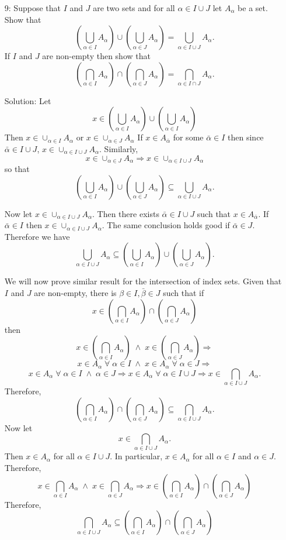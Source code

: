 \begin{enumerate}
\item[9:] Suppose that $I$ and $J$ are two sets and for all $\alpha \in 
I \cup J$ let $A_\alpha$ be a set. Show that
\[
\left(\bigcup_{\alpha \in I} A_\alpha\right) \cup
\left(\bigcup_{\alpha \in J} A_\alpha\right) = 
\bigcup_{\alpha \in I \cup J} A_\alpha.
\]
If $I$ and $J$ are non-empty then show that
\[
\left(\bigcap_{\alpha \in I} A_\alpha\right) \cap
\left(\bigcap_{\alpha \in J} A_\alpha\right) = 
\bigcap_{\alpha \in I \cap J} A_\alpha.
\]
\item[Solution:] Let 
\[
x \in \left(\bigcup_{\alpha \in I} A_\alpha\right) \cup
\left(\bigcup_{\alpha \in I} A_\alpha\right)
\]
Then $x \in \cup_{\alpha \in I} A_\alpha$ or $x \in \cup_{\alpha \in J}
A_\alpha$ If $x \in A_{\bar{\alpha}}$ for some $\bar{\alpha} \in I$ then 
since $\bar{\alpha} \in I \cup J$, $x \in \cup_{\alpha \in I \cup J} 
A_\alpha$. Similarly,
\[
x \in \cup_{\alpha \in J}A_\alpha \Rightarrow x \in \cup_{\alpha \in I 
\cup J} A_\alpha
\]
so that
\[
\left(\bigcup_{\alpha \in I} A_\alpha\right) \cup
\left(\bigcup_{\alpha \in J} A_\alpha\right) \subseteq
\bigcup_{\alpha \in I \cup J} A_\alpha.
\]

Now let $x \in \cup_{\alpha \in I \cup J} A_\alpha$. Then there exists
$\bar{\alpha} \in I \cup J$ such that $x \in A_{\bar{\alpha}}$. If 
$\bar{\alpha} \in I$ then $x \in \cup_{\alpha \in I \cup J}A_\alpha$. The
same conclusion holds good if $\bar{\alpha} \in J$. Therefore we have
\[
\bigcup_{\alpha \in I \cup J} A_\alpha \subseteq
\left(\bigcup_{\alpha \in I} A_\alpha\right) \cup
\left(\bigcup_{\alpha \in J} A_\alpha\right).
\]

We will now prove similar result for the intersection of index sets. Given
that $I$ and $J$ are non-empty, there is $\beta \in I, \bar{\beta} \in J$
such that if
\[
x \in 
\left(\bigcap_{\alpha \in I} A_\alpha\right) \cap
\left(\bigcap_{\alpha \in J} A_\alpha\right) 
\]
then 
\[
x \in \left(\bigcap_{\alpha \in I} A_\alpha\right) \;\land\;
x \in \left(\bigcap_{\alpha \in J} A_\alpha\right) \Rightarrow 
\]
\[
x \in A_\alpha \;\forall\; \alpha \in I \;\land\; x \in A_\alpha
\;\forall\; \alpha \in J \Rightarrow
\]
\[
x \in A_\alpha \;\forall\; \alpha \in I \;\land\; \alpha \in J 
\Rightarrow x \in A_\alpha \;\forall\; \alpha \in I \cup J \Rightarrow
x \in \bigcap_{\alpha \in I \cup J} A_\alpha.
\]
Therefore,
\[
\left(\bigcap_{\alpha \in I} A_\alpha\right) \cap
\left(\bigcap_{\alpha \in J} A_\alpha\right) \subseteq
\bigcap_{\alpha \in I \cup J} A_\alpha.
\]
Now let
\[
x \in \bigcap_{\alpha \in I \cup J} A_\alpha.
\]
Then $x \in A_\alpha$ for all $\alpha \in I \cup J$. In particular, $x
\in A_\alpha$ for all $\alpha \in I$ and $\alpha \in J$. Therefore,
\[
x \in \bigcap_{\alpha \in I}A_\alpha \;\land\;
x \in \bigcap_{\alpha \in J}A_\alpha \Rightarrow 
x \in \left(\bigcap_{\alpha \in I}A_\alpha\right) \cap
\left(\bigcap_{\alpha \in J}A_\alpha\right)
\]
Therefore,
\[
\bigcap_{\alpha \in I \cup J} A_\alpha \subseteq
\left(\bigcap_{\alpha \in I}A_\alpha\right) \cap
\left(\bigcap_{\alpha \in J}A_\alpha\right)
\]


\end{enumerate}
